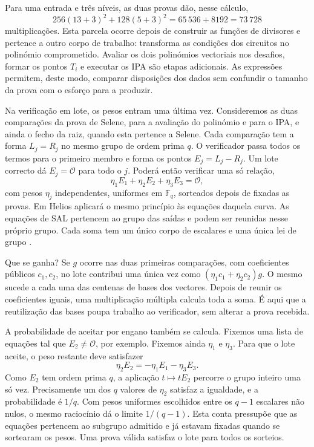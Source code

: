 Para uma entrada e três níveis, as duas provas dão,
nesse cálculo,
\[
 256(13+3)^2+128(5+3)^2
   =65\,536+8192=73\,728
\]
multiplicações. Esta parcela ocorre depois de construir
as funções de divisores e pertence a outro corpo de
trabalho: transforma as condições dos circuitos no
polinómio comprometido. Avaliar os dois polinómios
vectoriais nos desafios, formar os pontos \(T_i\) e
executar os IPA são etapas adicionais. As expressões
permitem, deste modo, comparar disposições dos dados
sem confundir o tamanho da prova com o esforço para a
produzir.

Na verificação em lote, os pesos entram uma última vez.
Consideremos as duas comparações da prova de Selene, para
a avaliação do polinómio e para o IPA, e ainda o fecho da raiz,
quando esta pertence a Selene. Cada comparação tem a forma
\(L_j=R_j\) no mesmo grupo de ordem prima \(q\). O verificador
passa todos os termos para o primeiro membro e forma os pontos
\(E_j=L_j-R_j\). Um lote correcto dá \(E_j=\mathcal O\) para
todo o \(j\). Poderá então verificar uma só relação,
\[
       \eta_1E_1+\eta_2E_2+\eta_3E_3=\mathcal O ,
\]
com pesos \(\eta_j\) independentes, uniformes em
\(\mathbb F_q\), sorteados depois de fixadas as provas.
Em Helios aplicará o mesmo princípio às equações daquela curva.
As equações de SAL pertencem ao grupo das saídas e podem ser
reunidas nesse próprio grupo. Cada soma tem um único corpo de
escalares e uma única lei de grupo
\cite{monero-oxide-fcmp-source}.

Que se ganha? Se \(g\) ocorre nas duas primeiras comparações,
com coeficientes públicos \(c_1,c_2\), no lote contribui uma
única vez como \((\eta_1c_1+\eta_2c_2)g\). O mesmo sucede a
cada uma das centenas de bases dos vectores. Depois de reunir os
coeficientes iguais, uma multiplicação múltipla calcula toda a
soma. É aqui que a reutilização das bases poupa trabalho ao
verificador, sem alterar a prova recebida.

A probabilidade de aceitar por engano também se calcula. Fixemos
uma lista de equações tal que \(E_2\ne\mathcal O\), por exemplo.
Fixemos ainda \(\eta_1\) e \(\eta_3\). Para que o lote aceite,
o peso restante deve satisfazer
\[
      \eta_2 E_2=-\eta_1E_1-\eta_3E_3 .
\]
Como \(E_2\) tem ordem prima \(q\), a aplicação
\(t\mapsto tE_2\) percorre o grupo inteiro uma só vez.
Precisamente um dos \(q\) valores de \(\eta_2\) satisfaz a
igualdade, e a probabilidade é \(1/q\). Com pesos uniformes
escolhidos entre os \(q-1\) escalares não nulos, o mesmo
raciocínio dá o limite \(1/(q-1)\). Esta conta pressupõe que
as equações pertencem ao subgrupo admitido e já estavam fixadas
quando se sortearam os pesos. Uma prova válida satisfaz o lote
para todos os sorteios.

